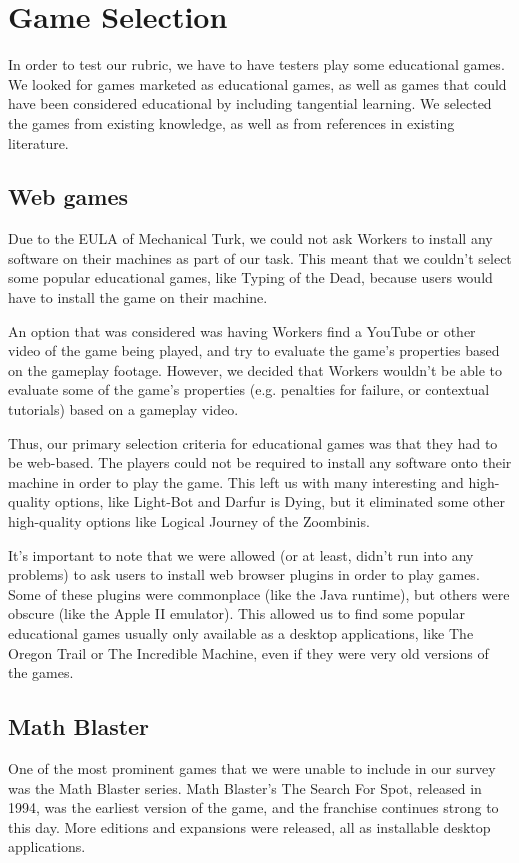 \documentclass[12pt]{report}
\begin{document}
	\section{Game Selection}
		In order to test our rubric, we have to have testers play some educational games. We looked for games marketed as educational games, as well as games that could have been considered educational by including tangential learning. We selected the games from existing knowledge, as well as from references in existing literature.

		\subsection{Web games}
			Due to the EULA of Mechanical Turk, we could not ask Workers to install any software on their machines as part of our task. This meant that we couldn't select some popular educational games, like Typing of the Dead, because users would have to install the game on their machine.

			An option that was considered was having Workers find a YouTube or other video of the game being played, and try to evaluate the game's properties based on the gameplay footage. However, we decided that Workers wouldn't be able to evaluate some of the game's properties (e.g. penalties for failure, or contextual tutorials) based on a gameplay video. 

			Thus, our primary selection criteria for educational games was that they had to be web-based. The players could not be required to install any software onto their machine in order to play the game. This left us with many interesting and high-quality options, like Light-Bot and Darfur is Dying, but it eliminated some other high-quality options like Logical Journey of the Zoombinis.

			It's important to note that we were allowed (or at least, didn't run into any problems) to ask users to install web browser plugins in order to play games. Some of these plugins were commonplace (like the Java runtime), but others were obscure (like the Apple II emulator). This allowed us to find some popular educational games usually only available as a desktop applications, like The Oregon Trail or The Incredible Machine, even if they were very old versions of the games.

		\subsection{Math Blaster}
			One of the most prominent games that we were unable to include in our survey was the Math Blaster series. Math Blaster's The Search For Spot, released in 1994, was the earliest version of the game, and the franchise continues strong to this day. More editions and expansions were released, all as installable desktop applications.
\end{document}
